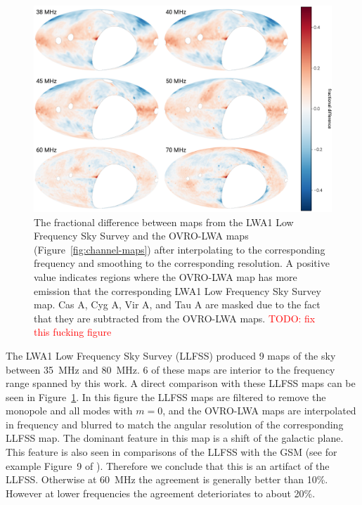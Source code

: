 \documentclass[twocolumn]{aastex61}
\newcommand{\todo}[1]{\textcolor{red}{TODO: #1}\PackageWarning{TODO:}{#1!}}
\begin{document}
\begin{figure}[t]
    \centering
    \includegraphics[width=\textwidth]{figures/lwa1/lwa1}
    \caption{
        The fractional difference between maps from the LWA1 Low Frequency Sky Survey and the
        OVRO-LWA maps (Figure~\ref{fig:channel-maps}) after interpolating to the corresponding
        frequency and smoothing to the corresponding resolution. A positive value indicates regions
        where the OVRO-LWA map has more emission that the corresponding LWA1 Low Frequency Sky
        Survey map. Cas A, Cyg A, Vir A, and Tau A are masked due to the fact that they are
        subtracted from the OVRO-LWA maps.
        \todo{fix this fucking figure}
    }
    \label{fig:lwa1-comparison}
\end{figure}

The LWA1 Low Frequency Sky Survey (LLFSS) \citep{2017MNRAS.469.4537D} produced 9 maps of the sky
between 35~MHz and 80~MHz. 6 of these maps are interior to the frequency range spanned by this work.
A direct comparison with these LLFSS maps can be seen in Figure~\ref{fig:lwa1-comparison}. In this
figure the LLFSS maps are filtered to remove the monopole and all modes with $m=0$, and the OVRO-LWA
maps are interpolated in frequency and blurred to match the angular resolution of the corresponding
LLFSS map. The dominant feature in this map is a shift of the galactic plane. This feature is also
seen in comparisons of the LLFSS with the GSM (see for example Figure~9 of
\citet{2017MNRAS.469.4537D}). Therefore we conclude that this is an artifact of the LLFSS. Otherwise
at 60~MHz the agreement is generally better than 10\%. However at lower frequencies the agreement
deterioriates to about 20\%.
\end{document}
